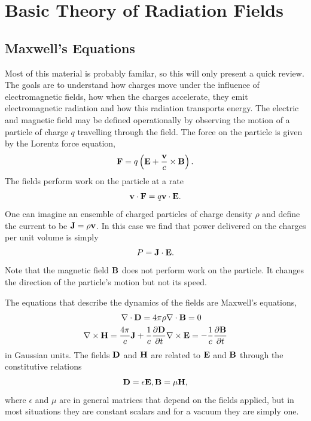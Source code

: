 \def\epbold{\mbox{\boldmath$\epsilon$}}
\chapter{Basic Theory of Radiation Fields}
\label{cha:basic-theory-radi}

\section{Maxwell's Equations}
\label{sec:maxwells-equations}
Most of this material is probably familar, so this will only present a
quick review.  The goals are to understand how charges move under the
influence of electromagnetic fields, how when the charges accelerate,
they emit electromagnetic radiation and how this radiation transports energy.
The electric and magnetic field may be
defined operationally by observing the motion of a particle of charge
$q$ travelling through the field.  The force on the particle is given
by the Lorentz force equation,
\begin{equation}
{\bf F} = q \left ( {\bf E} + \frac{\bf v}{c} \times {\bf B} \right ).
\label{eq:124}
\end{equation}
The fields perform work on the particle at a rate
\begin{equation}
{\bf v}\cdot {\bf F} = q {\bf v} \cdot {\bf E}.
\label{eq:125}
\end{equation}
One can imagine an ensemble of charged particles of charge density
$\rho$ and define the current to be ${\bf J}=\rho {\bf v}$.  In this
case we find that power delivered on the charges per unit volume is
simply
\begin{equation}
P = {\bf J} \cdot {\bf E}.
\label{eq:126}
\end{equation}
Note that the magnetic field ${\bf B}$ does not perform work on the
particle.   It changes the direction of the particle's motion but not
its speed.

The equations that describe the dynamics of the fields are Maxwell's
equations,
\begin{eqnarray}
{\bf \nabla} \cdot {\bf D} = 4\pi \rho & {\bf \nabla} \cdot {\bf B} =
0 \nonumber \\
{\bf \nabla} \times {\bf H} = \frac{4\pi}{c} {\bf J} +\frac{1}{c} 
\frac{\partial {\bf D}}{\partial {t}}
& {\bf \nabla} \times {\bf E} = -\frac{1}{c} \frac{\partial {\bf B}}{\partial {t}} 
\label{eq:127}
\end{eqnarray}
in Gaussian units.   The fields ${\bf D}$ and ${\bf H}$ are related to
${\bf E}$ and ${\bf B}$ through the constitutive relations
\begin{equation}
{\bf D} = \epsilon {\bf E}, {\bf B} = \mu {\bf H}, 
\label{eq:128}
\end{equation}
where $\epsilon$ and $\mu$ are in general matrices that depend on the
fields applied, but in most situations they are constant scalars and
for a vacuum they are simply one.

